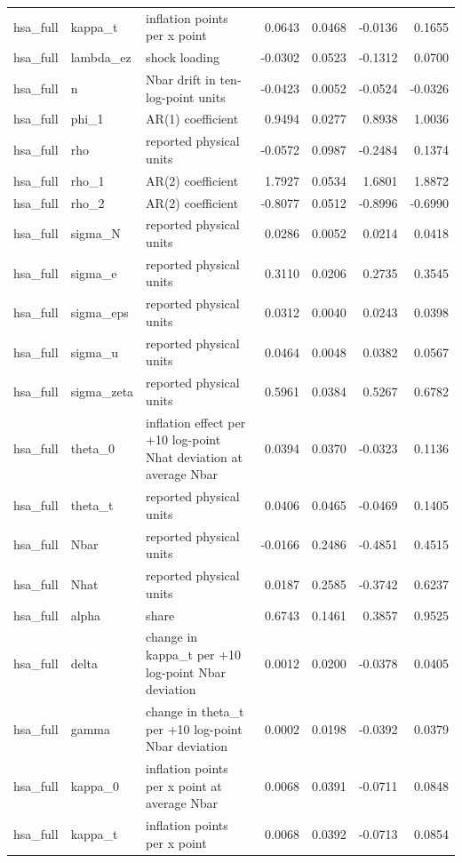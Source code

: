 \begin{tabular}{lllrrrr}
hsa\_full & kappa\_t & inflation points per x point & 0.0643 & 0.0468 & -0.0136 & 0.1655 \\
hsa\_full & lambda\_ez & shock loading & -0.0302 & 0.0523 & -0.1312 & 0.0700 \\
hsa\_full & n & Nbar drift in ten-log-point units & -0.0423 & 0.0052 & -0.0524 & -0.0326 \\
hsa\_full & phi\_1 & AR(1) coefficient & 0.9494 & 0.0277 & 0.8938 & 1.0036 \\
hsa\_full & rho & reported physical units & -0.0572 & 0.0987 & -0.2484 & 0.1374 \\
hsa\_full & rho\_1 & AR(2) coefficient & 1.7927 & 0.0534 & 1.6801 & 1.8872 \\
hsa\_full & rho\_2 & AR(2) coefficient & -0.8077 & 0.0512 & -0.8996 & -0.6990 \\
hsa\_full & sigma\_N & reported physical units & 0.0286 & 0.0052 & 0.0214 & 0.0418 \\
hsa\_full & sigma\_e & reported physical units & 0.3110 & 0.0206 & 0.2735 & 0.3545 \\
hsa\_full & sigma\_eps & reported physical units & 0.0312 & 0.0040 & 0.0243 & 0.0398 \\
hsa\_full & sigma\_u & reported physical units & 0.0464 & 0.0048 & 0.0382 & 0.0567 \\
hsa\_full & sigma\_zeta & reported physical units & 0.5961 & 0.0384 & 0.5267 & 0.6782 \\
hsa\_full & theta\_0 & inflation effect per +10 log-point Nhat deviation at average Nbar & 0.0394 & 0.0370 & -0.0323 & 0.1136 \\
hsa\_full & theta\_t & reported physical units & 0.0406 & 0.0465 & -0.0469 & 0.1405 \\
hsa\_full & Nbar & reported physical units & -0.0166 & 0.2486 & -0.4851 & 0.4515 \\
hsa\_full & Nhat & reported physical units & 0.0187 & 0.2585 & -0.3742 & 0.6237 \\
hsa\_full & alpha & share & 0.6743 & 0.1461 & 0.3857 & 0.9525 \\
hsa\_full & delta & change in kappa\_t per +10 log-point Nbar deviation & 0.0012 & 0.0200 & -0.0378 & 0.0405 \\
hsa\_full & gamma & change in theta\_t per +10 log-point Nbar deviation & 0.0002 & 0.0198 & -0.0392 & 0.0379 \\
hsa\_full & kappa\_0 & inflation points per x point at average Nbar & 0.0068 & 0.0391 & -0.0711 & 0.0848 \\
hsa\_full & kappa\_t & inflation points per x point & 0.0068 & 0.0392 & -0.0713 & 0.0854 \\

\end{tabular}
